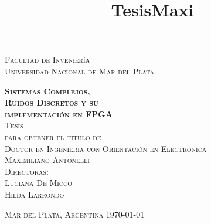 

\title{TesisMaxi} %

\begin{titlepage}

\begin{center}
	
\textsc{\Large Facultad de Inveniería \\ Universidad Nacional de Mar del Plata}\\[4em]

\vspace{4em}

\textsc{\Huge \textbf{Sistemas Complejos,\\Ruidos Discretos y su\\[.7em]implementación en FPGA}}\\[4em]

\textsc{\large Tesis}\\[3em]

\textsc{para obtener el título de}\\[1em]

\textsc{Doctor en Ingeniería con Orientación en Electrónica}\\[1em]


\textsc{\Large Maximiliano Antonelli}\\[4em]

\textsc{Directoras:\\ Luciana De Micco\\ Hilda Larrondo}

\vfill

\textsc{Mar del Plata, Argentina \hfill \today}

\end{center}

\end{titlepage}